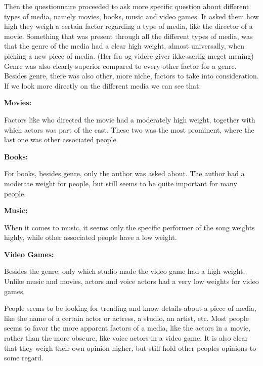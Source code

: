 Then the questionnaire proceeded to ask more specific question about different types of media, namely movies, books, music and video games. It asked them how high they weigh a certain factor regarding a type of media, like the director of a movie. Something that was present through all the different types of media, was that the genre of the media had a clear high weight, almost universally, when picking a new piece of media. (Her fra og videre giver ikke særlig meget mening) Genre was also clearly superior compared to every other factor for a genre. Besides genre, there was also other, more niche, factors to take into consideration.
If we look more directly on the different media we can see that:

\textbf{Movies:}

Factors like who directed the movie had a moderately high weight, together with which actors was part of the cast. These two was the most prominent, where the last one was other associated people.

\textbf{Books:}

For books, besides genre, only the author was asked about. The author had a moderate weight for people, but still seems to be quite important for many people.

\textbf{Music:}

When it comes to music, it seems only the specific performer of the song weights highly, while other associated people have a low weight.

\textbf{Video Games:}

Besides the genre, only which studio made the video game had a high weight. Unlike music and movies, actors and voice actors had a very low weights for video games.

People seems to be looking for trending and know details about a piece of media, like the name of a certain actor or actress, a studio, an artist, etc. Most people seems to favor the more apparent factors of a media, like the actors in a movie, rather than the more obscure, like voice actors in a video game. It is also clear that they weigh their own opinion higher, but still hold other peoples opinions to some regard.